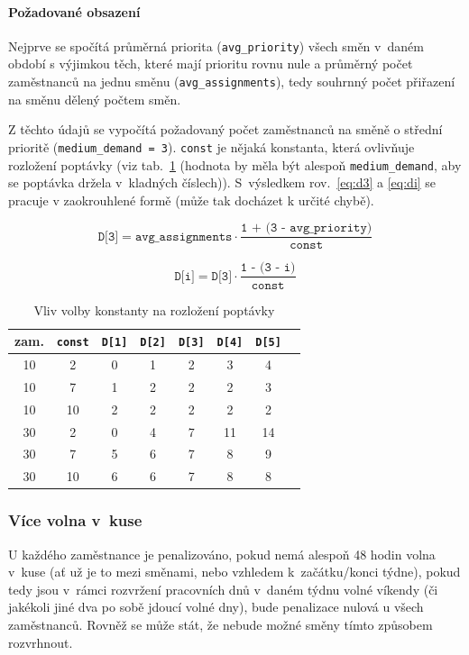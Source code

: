 \documentclass[twoside]{ctuthesis}
\begin{document}
\paragraph{Požadované obsazení}
Nejprve se spočítá průměrná priorita (\texttt{avg\_priority}) všech směn v~daném období s výjimkou těch, které mají prioritu rovnu nule a průměrný počet zaměstnanců na jednu směnu (\texttt{avg\_assignments}), tedy souhrnný počet přiřazení na směnu dělený počtem směn.

Z těchto údajů se vypočítá požadovaný počet zaměstnanců na směně o střední prioritě (\texttt{medium\_demand = 3}). \texttt{const} je nějaká konstanta, která ovlivňuje rozložení poptávky (viz tab.~\ref{tab:demandfactor} (hodnota by měla být alespoň \texttt{medium\_demand}, aby se poptávka držela v~kladných číslech)). S~výsledkem rov.~\ref{eq:d3} a \ref{eq:di} se pracuje v zaokrouhlené formě (může tak docházet k určité chybě).

\begin{equation}
	\label{eq:d3}
	\texttt{D[3]} = \texttt{avg\_assignments} \cdot \frac{\texttt{1 + (3 - avg\_priority})}{\texttt{const}}
\end{equation}

\begin{equation}
	\label{eq:di}
	\texttt{D[i]} = \texttt{D[3]} \cdot \frac{\texttt{1 - (3 - i})}{\texttt{const}}
\end{equation}

\begin{table}[h]
	\caption{Vliv volby konstanty na rozložení poptávky}
	\label{tab:demandfactor}
	\begin{tabular}{|c|c|c|c|c|c|c|c|}
		\hline
		zam. & \texttt{const} & \texttt{D[1]} & \texttt{D[2]} & \texttt{D[3]} & \texttt{D[4]} & \texttt{D[5]} \\
		\hline
		10 & 2 & 0 & 1 & 2 & 3 & 4 \\
		10 & 7 & 1 & 2 & 2 & 2 & 3 \\
		10 & 10 & 2 & 2 & 2 & 2 & 2 \\
		30 & 2 & 0 & 4 & 7 & 11 & 14 \\
		30 & 7 & 5 & 6 & 7 & 8 & 9 \\
		30 & 10 & 6 & 6 & 7 & 8 & 8 \\
		\hline
	\end{tabular}
\end{table}

\subsubsection{Více volna v~kuse}
U každého zaměstnance je penalizováno, pokud nemá alespoň 48 hodin volna v~kuse (ať už je to mezi směnami, nebo vzhledem k~začátku/konci týdne), pokud tedy jsou v~rámci rozvržení pracovních dnů v~daném týdnu volné víkendy (či jakékoli jiné dva po sobě jdoucí volné dny), bude penalizace nulová u všech zaměstnanců. Rovněž se může stát, že nebude možné směny tímto způsobem rozvrhnout.
\end{document}
